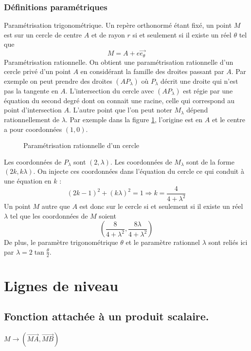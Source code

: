 \subsubsection{Définitions paramétriques}
Paramétrisation trigonométrique.\newline
Un repère orthonormé étant fixé, un point $M$ est sur un cercle de centre $A$ et de rayon $
r$ si et seulement si il existe un réel $\theta$ tel que 
\begin{displaymath}
 M = A +e\overrightarrow{e_\theta}
\end{displaymath}
Paramétrisation rationnelle.\newline
On obtient une paramétrisation rationnelle d'un cercle privé d'un point $A$ en considérant la famille des droites passant par $A$. Par exemple on peut prendre des droites $(AP_\lambda)$ où $P_\lambda$ décrit une droite qui n'est pas la tangente en $A$. L'intersection du cercle avec $(AP_\lambda)$ est régie par une équation du second degré dont on connait une racine, celle qui correspond au point d'intersection $A$. L'autre point que l'on peut noter $M_\lambda$ dépend rationnellement de $\lambda$. Par exemple dans la figure \ref{fig:C2005_3}, l'origine est en $A$ et le centre a pour coordonnées $(1,0)$.
\begin{figure}[ht]
 \centering

\caption{Paramétrisation rationnelle d'un cercle}
\label{fig:C2005_3}
\end{figure}
Les coordonnées de $P_\lambda$ sont $(2,\lambda)$. Les coordonnées de $M_\lambda$ sont de la forme $(2k,k\lambda)$. On  injecte ces coordonnées dans l'équation du cercle ce qui conduit à une équation en $k$ :
\begin{displaymath}
 (2k-1)^2+(k\lambda)^2=1\Rightarrow k=\dfrac{4}{4+\lambda^2}
\end{displaymath}
Un point $M$ autre que $A$ est donc sur le cercle si et seulement si il existe un réel $\lambda$ tel que les coordonnées de $M$ soient
\begin{displaymath}
 (\dfrac{8}{4+\lambda^2},\dfrac{8\lambda}{4+\lambda^2})
\end{displaymath}
De plus, le paramètre trigonométrique $\theta$ et le paramètre rationnel $\lambda$ sont reliés ici par $\lambda =2\tan\frac{\theta}{2}$.
\section{Lignes de niveau}
\subsection{Fonction attachée à un produit scalaire.}
$M\rightarrow (\overrightarrow{MA},\overrightarrow{MB})$
